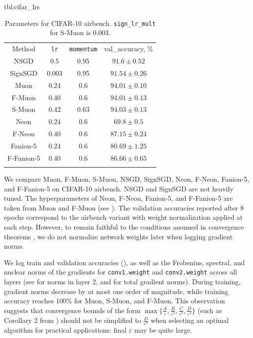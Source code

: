 \documentclass[pmlr]{jmlr}%
\renewcommand{\epsilon}{\varepsilon}
\begin{document}
 \begin{table}[htbp]
 \floatconts
   {tbl:cifar_lrs}
   {\caption{Parameters for CIFAR-10 airbench. \texttt{sign\_lr\_mult} for S-Muon is 0.003.}}
   {%
     \begin{tabular}{cccc}
       \arrayrulecolor{black}\toprule
       Method & \texttt{lr}  & \texttt{momentum}  & val\_accuracy, \% \\
       \arrayrulecolor{black}\hline
       NSGD & 0.5 & 0.95 & $91.6 \pm 0.52$ \\
       \hdashline
       SignSGD & 0.003 & 0.95 & $91.54 \pm 0.26$ \\
       \hdashline
       Muon & 0.24 & 0.6 & $94.01 \pm 0.10$ \\
       F-Muon & 0.40 & 0.6 & $94.01 \pm 0.13$\\
       \hdashline
       S-Muon & 0.42 & 0.63 & $94.03 \pm 0.13$ \\
       \hdashline
       Neon & 0.24 & 0.6 & $69.8 \pm 0.5$ \\
       F-Neon & 0.40 & 0.6 & $87.15 \pm 0.24$\\
       \hdashline
       Fanion-5 & 0.24 & 0.6 & $80.69 \pm 1.25$ \\
       F-Fanion-5 & 0.40 & 0.6 & $86.66 \pm 0.65$\\
       \arrayrulecolor{black}\bottomrule
     \end{tabular}%
   }
 \end{table}
 
 We compare Muon, F-Muon, S-Muon, NSGD, SignSGD, Neon, F-Neon, Fanion-5, and F-Fanion-5 on CIFAR-10 airbench. NSGD and SignSGD are not heavily tuned. The hyperparameters of Neon, F-Neon, Fanion-5, and F-Fanion-5 are taken from Muon and F-Muon (see ). The validation accuracies reported after 8 epochs correspond to the airbench variant with weight normalization applied at each step. However, to remain faithful to the conditions assumed in convergence theorems \citep{kovalev2025understanding,riabinin2025gluon}, we do not normalize network weights later when logging gradient norms.
 
 We log train and validation accuracies (), as well as the Frobenius, spectral, and nuclear norms of the gradients for \texttt{conv1.weight} and \texttt{conv2.weight} across all layers (see  for norms in layer 2, and  for total gradient norms). During training, gradient norms decrease by at most one order of magnitude, while training accuracy reaches 100\% for Muon, S-Muon, and F-Muon. This observation suggests that convergence bounds of the form $\max\{\frac{A}{\epsilon}, \frac{B}{\epsilon^2}, \frac{C}{\epsilon^3}, \frac{D}{\epsilon^4}\}$ (such as Corollary 2 from \citet{kovalev2025understanding}) should not be simplified to $\frac{D}{\epsilon^4}$ when selecting an optimal algorithm for practical applications: final $\epsilon$ may be quite large.
 
\end{document}
